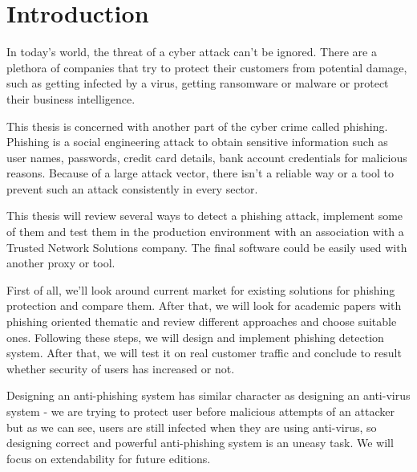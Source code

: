 \documentclass[
  digital, %
  oneside, %
  table,   %
  nolof,     %
  nolot,     %
]{fithesis3}
\begin{document}
\chapter{Introduction}

\setlength {\marginparwidth }{2cm}

\nocite{apwg-2012-4}
\nocite{apwg-2013-1}
\nocite{apwg-2013-2}
\nocite{apwg-2013-3}
\nocite{apwg-2013-4}
\nocite{apwg-2014-1}
\nocite{apwg-2014-2}
\nocite{apwg-2014-3}
\nocite{apwg-2014-4}
\nocite{apwg-2015-1}
\nocite{apwg-2015-4}
\nocite{apwg-2016-1}
\nocite{apwg-2016-2}
\nocite{apwg-2016-3}
\nocite{apwg-2016-4}
\nocite{apwg-2017-1}
\nocite{apwg-2017-3}
\nocite{apwg-2017-4}
\nocite{apwg-2018-1}
\nocite{apwg-2018-2}
\nocite{apwg-2018-3}
\nocite{apwg-2018-4}
\nocite{apwg-2019-1}
\nocite{apwg-2019-2}

In today's world, the threat of a cyber attack can't be ignored. There are a plethora of companies that try to protect their customers from potential damage, such as getting infected by a virus, getting ransomware or malware or protect their business intelligence.

This thesis is concerned with another part of the cyber crime called phishing. Phishing is a social engineering attack to obtain sensitive information such as user names, passwords, credit card details, bank account credentials for malicious reasons.  Because of a large attack vector, there isn't a reliable way or a tool to prevent such an attack consistently in every sector.

This thesis will review several ways to detect a phishing attack, implement some of them and test them in the production environment with an association with a Trusted Network Solutions company. The final software could be easily used with another proxy or tool.

First of all, we'll look around current market for existing solutions for phishing protection and compare them. After that, we will look for academic papers with phishing oriented thematic and review different approaches and choose suitable ones. Following these steps, we will design and implement phishing detection system. After that, we will test it on real customer traffic and conclude to result whether security of users has increased or not.

Designing an anti-phishing system has similar character as designing an anti-virus system - we are trying to protect user before malicious attempts of an attacker but as we can see, users are still infected when they are using anti-virus, so designing correct and powerful anti-phishing system is an uneasy task. We will focus on extendability for future editions.
\end{document}
